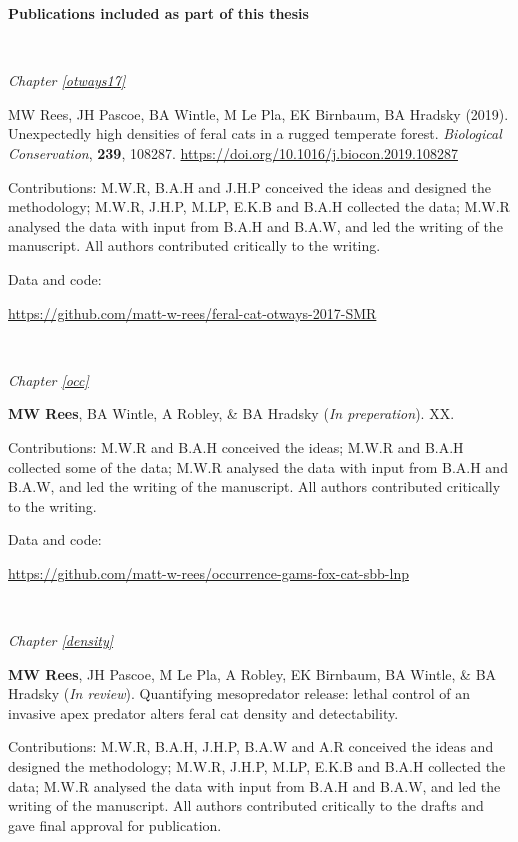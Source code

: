 \documentclass[11pt,a4paper,titlepage,twoside,openright]{style/unimelbthesis}
\begin{document}
\begin{frontmatter}
\begin{preface}
    \newpage
    
    \textbf{Publications included as part of this thesis}
    
    \(~\)
    
    \emph{Chapter \ref{otways17}}
    
    MW Rees, JH Pascoe, BA Wintle, M Le Pla, EK Birnbaum, BA Hradsky (2019). Unexpectedly high densities of feral cats in a rugged temperate forest. \emph{Biological Conservation}, \textbf{239}, 108287. \url{https://doi.org/10.1016/j.biocon.2019.108287}
    
    Contributions: M.W.R, B.A.H and J.H.P conceived the ideas and designed the methodology; M.W.R, J.H.P, M.LP, E.K.B and B.A.H collected the data; M.W.R analysed the data with input from B.A.H and B.A.W, and led the writing of the manuscript. All authors contributed critically to the writing.
    
    Data and code:
    
    \url{https://github.com/matt-w-rees/feral-cat-otways-2017-SMR}
    
    \(~\)
    
    \emph{Chapter \ref{occ}}
    
    \textbf{MW Rees}, BA Wintle, A Robley, \& BA Hradsky (\emph{In preperation}). XX.
    
    Contributions: M.W.R and B.A.H conceived the ideas; M.W.R and B.A.H collected some of the data; M.W.R analysed the data with input from B.A.H and B.A.W, and led the writing of the manuscript. All authors contributed critically to the writing.
    
    Data and code:
    
    \url{https://github.com/matt-w-rees/occurrence-gams-fox-cat-sbb-lnp}
    
    \(~\)
    
    \emph{Chapter \ref{density}}
    
    \textbf{MW Rees}, JH Pascoe, M Le Pla, A Robley, EK Birnbaum, BA Wintle, \& BA Hradsky (\emph{In review}). Quantifying mesopredator release: lethal control of an invasive apex predator alters feral cat density and detectability.
    
    Contributions: M.W.R, B.A.H, J.H.P, B.A.W and A.R conceived the ideas and designed the methodology; M.W.R, J.H.P, M.LP, E.K.B and B.A.H collected the data; M.W.R analysed the data with input from B.A.H and B.A.W, and led the writing of the manuscript. All authors contributed critically to the drafts and gave final approval for publication.
    

\end{preface}
\end{frontmatter}
\end{document}

